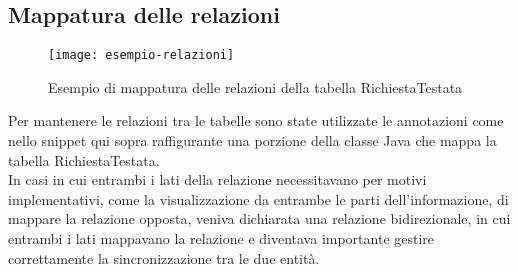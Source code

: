\subsection{Mappatura delle relazioni}
\begin{figure}[H] 
    \centering 
    \texttt{[image: esempio-relazioni]} 
    \caption{Esempio di mappatura delle relazioni della tabella RichiestaTestata}
\end{figure}
\noindent Per mantenere le relazioni tra le tabelle sono state utilizzate le annotazioni come nello snippet qui sopra raffigurante una porzione della classe Java che mappa la tabella RichiestaTestata.\\
In casi in cui entrambi i lati della relazione necessitavano per motivi implementativi, come la visualizzazione da entrambe le parti dell'informazione, di mappare la relazione opposta, veniva dichiarata una relazione bidirezionale, in cui entrambi i lati mappavano la relazione e diventava importante gestire correttamente la sincronizzazione tra le due entità.
